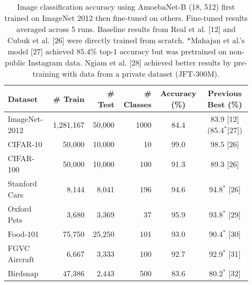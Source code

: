 \documentclass[12pt]{article}
\begin{document}
\begin{itemize}
\begin{table}[H]
\end{table}
\begin{table}[H]
\centering
\caption{Image classification accuracy using AmoebaNet-B (18, 512) first trained on ImageNet 2012 then fine-tuned on others. Fine-tuned results averaged across 5 runs. Baseline results from Real et al. [12] and Cubuk et al. [26] were directly trained from scratch. *Mahajan et al.’s model [27] achieved 85.4\% top-1 accuracy but was pretrained on non-public Instagram data. Ngiam et al. [28] achieved better results by pre-training with data from a private dataset (JFT-300M).}
\begin{tabular}{|l|r|r|r|c|c|}
\hline
Dataset         & \# Train  & \# Test  & \# Classes & Accuracy (\%) & Previous Best (\%) \\
\hline
ImageNet-2012   & 1,281,167 & 50,000   & 1000       & 84.4          & 83.9 [12] (85.4$^*$[27]) \\
CIFAR-10        & 50,000    & 10,000   & 10         & 99.0          & 98.5 [26] \\
CIFAR-100       & 50,000    & 10,000   & 100        & 91.3          & 89.3 [26] \\
Stanford Cars   & 8,144     & 8,041    & 196        & 94.6          & 94.8$^*$ [26] \\
Oxford Pets     & 3,680     & 3,369    & 37         & 95.9          & 93.8$^*$ [29] \\
Food-101        & 75,750    & 25,250   & 101        & 93.0          & 90.4$^*$ [30] \\
FGVC Aircraft   & 6,667     & 3,333    & 100        & 92.7          & 92.9$^*$ [31] \\
Birdsnap        & 47,386    & 2,443    & 500        & 83.6          & 80.2$^*$ [32] \\
\hline
\end{tabular}
\end{table}
\end{itemize}
\end{document}
